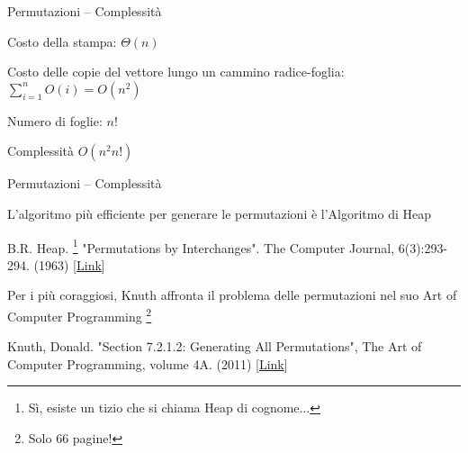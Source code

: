 \begin{frame}{Permutazioni -- Complessità}

\vspace{-9pt}
\begin{myboxtitle}[Complessità]
\BIL
\item Costo della stampa: $\Theta(n)$
\item Costo delle copie del vettore lungo un cammino radice-foglia:
$
  \sum_{i=1}^n O(i) = O(n^2)
$
\item Numero di foglie: $n!$
\item Complessità $O(n^2 n!)$
\EIL
\end{myboxtitle}

\end{frame}

\begin{frame}{Permutazioni -- Complessità}

\begin{myboxtitle}
\BIL
\item L'algoritmo più efficiente per generare le permutazioni è l'Algoritmo di Heap 
  \BI
  \item B.R. Heap. \footnote{Sì, esiste un tizio che si chiama Heap di cognome...} "Permutations by Interchanges". The Computer Journal, 6(3):293-294. (1963) [\href{https://academic.oup.com/comjnl/article/6/3/293/360213}{Link}]
  \EI
\item Per i più coraggiosi, Knuth affronta il problema delle permutazioni nel suo Art of Computer Programming \footnote{Solo 66 pagine!}
  \BI
  \item Knuth, Donald. "Section 7.2.1.2: Generating All Permutations", The Art of Computer Programming, volume 4A.  (2011)
  [\href{http://www-cs-faculty.stanford.edu/~uno/fasc2b.ps.gz}{Link}]
  \EI
\EIL
\end{myboxtitle}

\end{frame}

